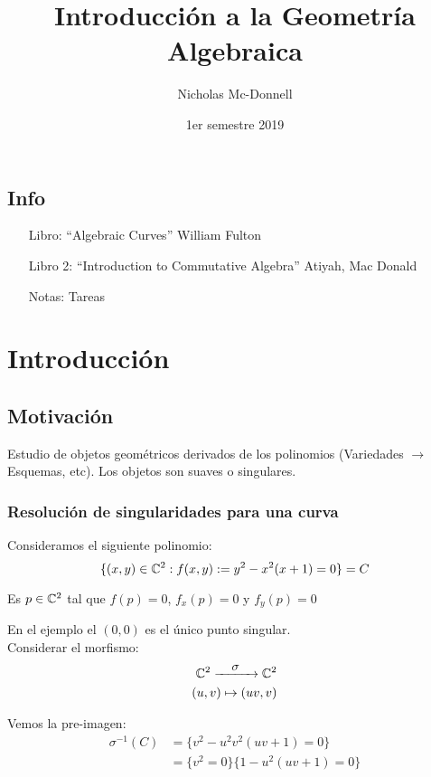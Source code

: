 

\title{Introducción a la Geometría Algebraica}
\author{Nicholas Mc-Donnell}
\date{1er semestre 2019}


\maketitle
\newpage
\tableofcontents
{}
\newpage
\section*{Info}
\begin{itemize}
    \item[Libro:] ``Algebraic Curves'' William Fulton
    \item[Libro 2:] ``Introduction to Commutative Algebra'' Atiyah, Mac Donald
    \item[Notas:] Tareas
\end{itemize}
\chapter{Introducción}
\section{Motivación}
Estudio de objetos geométricos derivados de los polinomios (Variedades $\rightarrow$ Esquemas, etc). Los objetos son suaves o singulares.

\subsection{Resolución de singularidades para una curva}
Consideramos el siguiente polinomio:
\[
    \{(x,y)\in\mathbb{C}^2: f(x,y):= y^2-x^2(x+1)=0\}=C
\]
\begin{defn}[Singularidad]
    Es $p\in\mathbb{C}^2$ tal que $f(p)=0$, $f_x(p)=0$ y $f_y(p)=0$
\end{defn}
En el ejemplo el $(0,0)$ es el único punto singular.\\
Considerar el morfismo:
\begin{align*}
    \set{C}^2\xrightarrow{\makebox[1cm]{$\sigma$}}\set{C}^2 \\
    (u,v)\mapsto(uv,v)
\end{align*}

Vemos la pre-imagen:
\begin{align*}
    \sigma^{-1}(C) & =\{v^2-u^2v^2(uv+1)=0\}     \\
                   & =\{v^2=0\}\{1-u^2(uv+1)=0\}
\end{align*}

